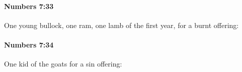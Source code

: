 		\paragraph{Numbers 7:33} %
			\label{NUMBERS-7-33}

			One young bullock, one ram, one lamb of the first year, for a burnt offering:


		\paragraph{Numbers 7:34} %
			\label{NUMBERS-7-34}

			One kid of the goats for a sin offering:


